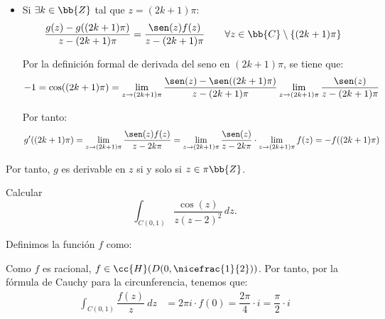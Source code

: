 \documentclass[12pt]{article}
\begin{document}
\begin{ejercicio}[3 puntos]
\begin{itemize}
            \item Si $\exists k\in \bb{Z}$ tal que $z=(2k+1)\pi$:
            \begin{equation*}
                \dfrac{g(z)-g((2k+1)\pi)}{z-(2k+1)\pi} = \dfrac{\sen(z)f(z)}{z-(2k+1)\pi}\qquad \forall z\in \bb{C}\setminus \{(2k+1)\pi\}
            \end{equation*}

            Por la definición formal de derivada del seno en $(2k+1)\pi$, se tiene que:
            \begin{equation*}
                -1 = \cos((2k+1)\pi) = \lim_{z\to (2k+1)\pi}\dfrac{\sen(z)-\sen((2k+1)\pi)}{z-(2k+1)\pi}
                \lim_{z\to (2k+1)\pi}\dfrac{\sen(z)}{z-(2k+1)\pi}
            \end{equation*}

            Por tanto:
            \begin{equation*}
                g'((2k+1)\pi) = \lim_{z\to (2k+1)\pi}\dfrac{\sen(z)f(z)}{z-2k\pi}
                = \lim_{z\to (2k+1)\pi}\dfrac{\sen(z)}{z-2k\pi}\cdot \lim_{z\to (2k+1)\pi} f(z)
                = -f((2k+1)\pi)
            \end{equation*}
        \end{itemize}
        Por tanto, $g$ es derivable en $z$ si y solo si $z\in \pi \bb{Z}$.
    \end{ejercicio}

    \begin{ejercicio}[1 punto]
        Calcular
        \[
            \int_{C(0,1)} \dfrac{\cos(z)}{z(z-2)^2} \, dz.
        \]

        Definimos la función $f$ como:

        Como $f$ es racional, $f\in \cc{H}(D(0,\nicefrac{1}{2}))$. Por tanto, por la fórmula de Cauchy para la circunferencia, tenemos que:
        \begin{align*}
            \int_{C(0,1)} \dfrac{f(z)}{z}\ dz &= 2\pi i \cdot f(0)=\dfrac{2\pi}{4}\cdot i = \dfrac{\pi}{2}\cdot i
        \end{align*}
    \end{ejercicio}
\end{document}
